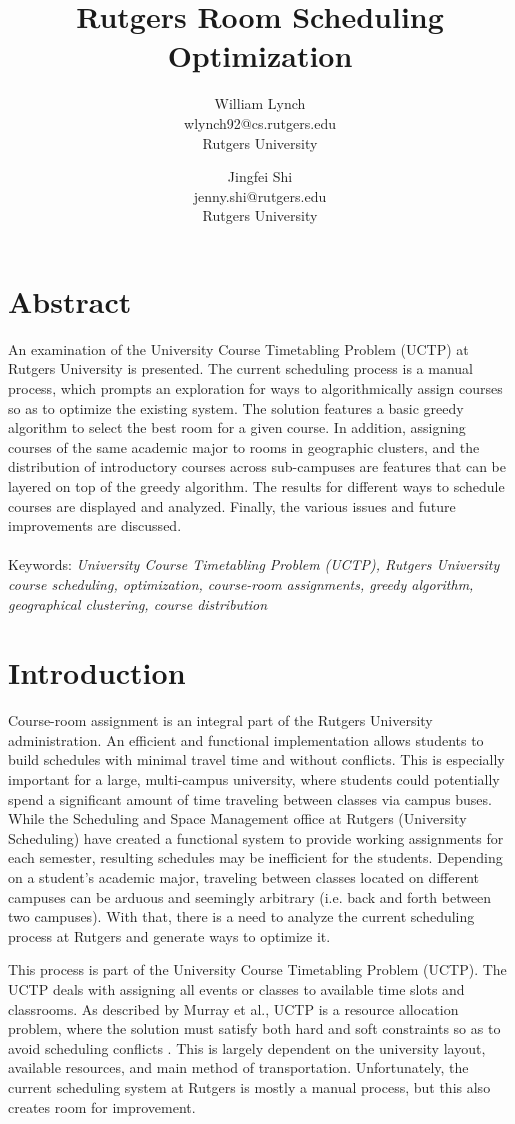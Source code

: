 \documentclass[12pt]{article}
\title{Rutgers Room Scheduling Optimization}
\author {William Lynch \\ wlynch92@cs.rutgers.edu \\ Rutgers University
	\and Jingfei Shi \\ jenny.shi@rutgers.edu \\ Rutgers University
}
\begin{document}
\maketitle
\section{Abstract}
An examination of the University Course Timetabling Problem (UCTP) at Rutgers
University is presented. The current scheduling process is a manual process,
which prompts an exploration for ways to algorithmically assign courses so as
to optimize the existing system. The solution features a basic greedy algorithm
to select the best room for a given course. In addition, assigning courses of
the same academic major to rooms in geographic clusters, and the distribution
of introductory courses across sub-campuses are features that can be layered on
top of the greedy algorithm. The results for different ways to schedule courses
are displayed and analyzed. Finally, the various issues and future improvements
are discussed.
\\\\
Keywords: \emph{University Course Timetabling Problem (UCTP), Rutgers University
course scheduling, optimization, course-room assignments, greedy algorithm,
geographical clustering, course distribution}

\section{Introduction}
	Course-room assignment is an integral part of the Rutgers University
	administration. An efficient and functional implementation allows students to
	build schedules with minimal travel time and without conflicts. This is
	especially important for a large, multi-campus university, where students could
	potentially spend a significant amount of time traveling between classes via
	campus buses. While the Scheduling and Space Management office at Rutgers
	(University Scheduling) have created a functional system to provide working
	assignments for each semester, resulting schedules may be inefficient for the
	students. Depending on a student’s academic major, traveling between classes
	located on different campuses can be arduous and seemingly arbitrary (i.e. back
	and forth between two campuses). With that, there is a need to analyze the
	current scheduling process at Rutgers and generate ways to optimize it.

	This process is part of the University Course Timetabling Problem (UCTP). The
	UCTP deals with assigning all events or classes to available time slots and
	classrooms. As described by Murray et al., UCTP is a resource allocation
	problem, where the solution must satisfy both hard and soft constraints so as
	to avoid scheduling conflicts \cite{citation1}. This is largely dependent on the university
	layout, available resources, and main method of transportation. Unfortunately,
	the current scheduling system at Rutgers is mostly a manual process, but this
	also creates room for improvement. 
\end{document}
